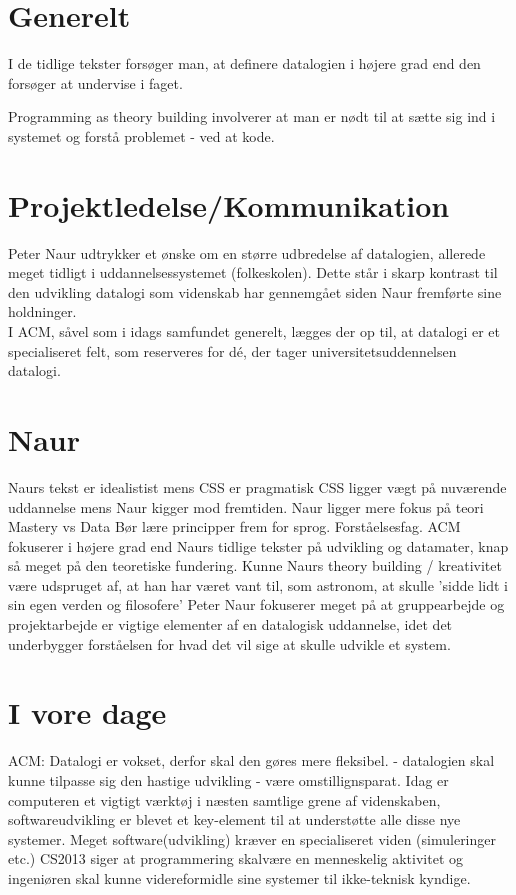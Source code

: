\section{Generelt}
I de tidlige tekster forsøger man, at definere datalogien i højere grad end den forsøger at undervise i faget.

Programming as theory building involverer at man er nødt til at sætte sig ind i systemet og forstå problemet - ved at
kode.



\section{Projektledelse/Kommunikation}
Peter Naur udtrykker et ønske om en større udbredelse af datalogien, allerede
meget tidligt i uddannelsessystemet (folkeskolen). Dette står i skarp kontrast
til den udvikling datalogi som videnskab har gennemgået siden Naur fremførte sine
holdninger.\\
I ACM, såvel som i idags samfundet generelt, lægges der op til, at datalogi er et
specialiseret felt, som reserveres for dé, der tager universitetsuddennelsen
datalogi.

\section{Naur}
Naurs tekst er idealistist mens CSS er pragmatisk
CSS ligger vægt på nuværende uddannelse mens Naur kigger mod fremtiden.
Naur ligger mere fokus på teori
Mastery vs Data
Bør lære principper frem for sprog. Forståelsesfag.
ACM fokuserer i højere grad end Naurs tidlige tekster på udvikling og datamater, knap så
meget på den teoretiske fundering.
Kunne Naurs theory building / kreativitet være udspruget af, at han har været vant til, som astronom, at skulle
'sidde lidt i sin egen verden og filosofere'
Peter Naur fokuserer meget på at gruppearbejde og projektarbejde er vigtige elementer af en datalogisk uddannelse,
idet det underbygger forståelsen for hvad det vil sige at skulle udvikle et system.


\section{I vore dage}
ACM: Datalogi er vokset, derfor skal den gøres mere fleksibel.
        - datalogien skal kunne tilpasse sig den hastige udvikling - være omstillignsparat.
Idag er computeren et vigtigt værktøj i næsten samtlige grene af videnskaben,
softwareudvikling er blevet et key-element til at understøtte alle disse nye
systemer.
Meget software(udvikling) kræver en specialiseret viden (simuleringer etc.)
CS2013 siger at programmering skalvære en menneskelig aktivitet og ingeniøren skal kunne videreformidle sine systemer til ikke-teknisk kyndige.

